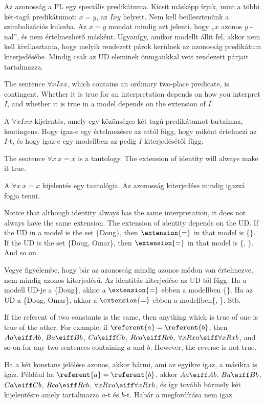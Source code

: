 Az azonosság a PL egy speciális predikátuma. Kicsit másképp írjuk, mint a többi két-tagú predikátumot: $ x = y $, az $ Ixy $ helyett. Nem kell beillesztenünk a szimbolizációs kulcsba. Az $ x = y $ mondat mindig azt jelenti, hogy „$ x $ azonos  $ y $ -nal”, és nem értelmezhető másként. Ugyanígy, amikor modellt állít fel, akkor nem kell kiválasztania, hogy melyik rendezett párok kerülnek az azonosság predikátum kiterjedésébe. Mindig csak az UD eleminek önmgaukkal vett rendezett párjait tartalmazza.

The sentence $\forall x Ixx$, which contains an ordinary two-place predicate, is contingent. Whether it is true for an interpretation depends on how you interpret $I$, and whether it is true in a model depends on the extension of $I$.

A $ \forall x Ixx$ kijelentés, amely egy közönséges két tagú predikátumot tartalmaz, kontingens. Hogy igaz-e egy értelmezésre az attól függ, hogy miként értelmezi az $I$-t, és hogy igaz-e egy modellben az pedig $I$ kiterjedésétől függ.

The sentence $\forall x\ x=x$ is a tautology. The extension of identity will always make it true.

A $\forall x\ x=x$ kijelentés egy tautológia. Az azonosság kiterjedése mindig igazzá fogja tenni.

Notice that although identity always has the same interpretation, it does not always have the same extension. The extension of identity depends on the UD. If the UD in a model is the set \{Doug\}, then $\extension{=}$ in that model is \{\}. If the UD is the set \{Doug, Omar\}, then $\extension{=}$ in that model is \{, \}. And so on.

Vegye figyelembe, hogy bár az azonosság mindig azonos módon van értelmezve, nem mindig azonos kiterjedésű. Az identitás kiterjedése az UD-től függ. Ha a modell UD-je a \{Doug\}, akkor a $\extension{=}$ ebben a modellben \{\}. Ha az UD a \{Doug, Omar\}, akkor a $ \extension{=}$ ebben a modellben\{,  \}. Stb.

If the referent of two constants is the same, then anything which is true of one is true of the other. For example, if $\referent{a}=\referent{b}$, then $Aa\eiff Ab$, $Ba\eiff Bb$, $Ca\eiff Cb$, $Rca\eiff Rcb$, $\forall x Rxa\eiff \forall x Rxb$, and so on for any two sentences containing $a$ and $b$. However, the reverse is not true.

Ha a két konstans jelölése azonos, akkor bármi, ami az egyikre igaz, a másikra is igaz. Például ha $\referent{a}=\referent{b}$, akkor $Aa\eiff Ab$, $Ba\eiff Bb$, $Ca\eiff Cb$, $Rca\eiff Rcb$, $\forall x Rxa\eiff \forall x Rxb$, és így tovább bármely két kijelentésre amely tartalmazza $a$-t és $b$-t. Habár a megfordítása nem igaz.

